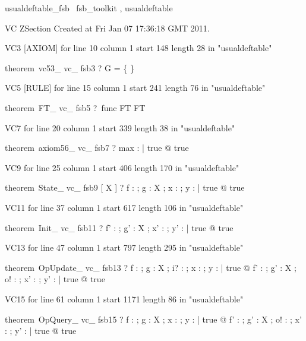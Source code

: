 \documentclass{article}
\begin{document}

\begin{zsection}
	 \SECTION usualdeftable\_fsb \parents~fsb\_toolkit , usualdeftable
\end{zsection}

VC ZSection Created at Fri Jan 07 17:36:18 GMT 2011.

VC3 [AXIOM] for line 10 column 1 start 148 length 28 in "usualdeftable"
\begin{zed}
theorem~vc53\_ vc\_ fsb3 \vdash ? \lnot G = \{ \}
\end{zed}

VC5 [RULE] for line 15 column 1 start 241 length 76 in "usualdeftable"
\begin{zed}
theorem~FT\_ vc\_ fsb5 \vdash ?~func \in \nat \cross FT \inj FT
\end{zed}

VC7 for line 20 column 1 start 339 length 38 in "usualdeftable"
\begin{zed}
theorem~axiom56\_ vc\_ fsb7 \vdash ? \exists max : \nat | true @ true
\end{zed}

VC9 for line 25 column 1 start 406 length 170 in "usualdeftable"
\begin{zed}
theorem~State\_ vc\_ fsb9 [ X ] \vdash ? \exists f : \nat \fun \nat ; g : X ; x : \nat ; y : \power \nat | true @ true
\end{zed}

VC11 for line 37 column 1 start 617 length 106 in "usualdeftable"
\begin{zed}
theorem~Init\_ vc\_ fsb11 \vdash ? \exists f' : \nat \fun \nat ; g' : X ; x' : \nat ; y' : \power \nat | true @ true
\end{zed}

VC13 for line 47 column 1 start 797 length 295 in "usualdeftable"
\begin{zed}
theorem~OpUpdate\_ vc\_ fsb13 \vdash ? \forall f : \nat \fun \nat ; g : X ; i? : \nat ; x : \nat ; y : \power \nat | true @ \exists f' : \nat \fun \nat ; g' : X ; o! : \nat ; x' : \nat ; y' : \power \nat | true @ true
\end{zed}

VC15 for line 61 column 1 start 1171 length 86 in "usualdeftable"
\begin{zed}
theorem~OpQuery\_ vc\_ fsb15 \vdash ? \forall f : \nat \fun \nat ; g : X ; x : \nat ; y : \power \nat | true @ \exists f' : \nat \fun \nat ; g' : X ; o! : \nat ; x' : \nat ; y' : \power \nat | true @ true
\end{zed}
\end{document}
